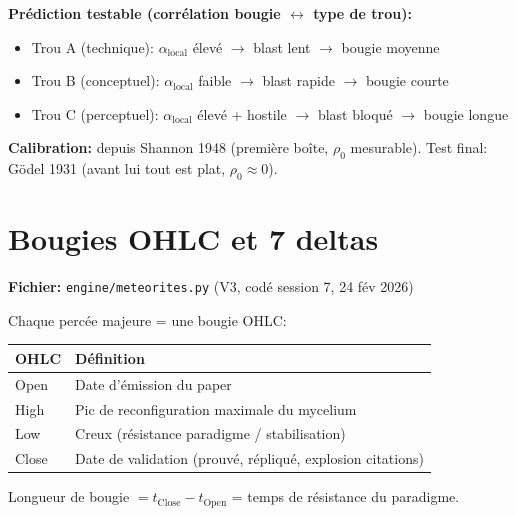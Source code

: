 \documentclass[11pt,a4paper]{article}
\begin{document}
\textbf{Pr\'ediction testable (corr\'elation bougie $\leftrightarrow$ type de trou):}
\begin{itemize}
\item Trou A (technique): $\alpha_{\text{local}}$ \'elev\'e $\to$ blast lent $\to$ bougie moyenne
\item Trou B (conceptuel): $\alpha_{\text{local}}$ faible $\to$ blast rapide $\to$ bougie courte
\item Trou C (perceptuel): $\alpha_{\text{local}}$ \'elev\'e + hostile $\to$ blast bloqu\'e $\to$ bougie longue
\end{itemize}

\textbf{Calibration:} depuis Shannon 1948 (premi\`ere bo\^ite, $\rho_0$ mesurable).
Test final: G\"odel 1931 (avant lui tout est plat, $\rho_0 \approx 0$).

\section{Bougies OHLC et 7 deltas}

\textbf{Fichier:} \texttt{engine/meteorites.py} (V3, cod\'e session 7, 24 f\'ev 2026)

Chaque perc\'ee majeure = une bougie OHLC:
\begin{center}
\begin{tabular}{ll}
\toprule
\textbf{OHLC} & \textbf{D\'efinition} \\
\midrule
Open & Date d'\'emission du paper \\
High & Pic de reconfiguration maximale du mycelium \\
Low & Creux (r\'esistance paradigme / stabilisation) \\
Close & Date de validation (prouv\'e, r\'epliqu\'e, explosion citations) \\
\bottomrule
\end{tabular}
\end{center}

Longueur de bougie $= t_{\text{Close}} - t_{\text{Open}}$ = temps de r\'esistance du paradigme.
\end{document}
